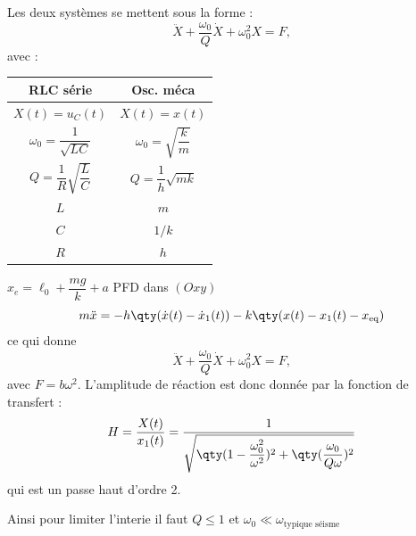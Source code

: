 \begin{solution}
\begin{questions}
    \questioncours Les deux systèmes se mettent sous la forme :
    $$\ddot{X} + \dfrac{\omega_0}{Q}\dot{X} + \omega_0^2 X = F,$$
    avec : \\
    \begin{tabular}{c|c}
        \textbf{RLC série} & \textbf{Osc. méca} \\ \hline
        $X(t) = u_C(t)$ & $X(t) = x(t)$ \\
        $\omega_0 = \dfrac{1}{\sqrt{LC}}$ & $\omega_0 = \sqrt{\dfrac{k}{m}}$ \\
        $Q = \dfrac{1}{R}\sqrt{\dfrac{L}{C}}$ & $Q = \dfrac{1}{h}\sqrt{mk}$ \\ \hline
        $L$ & $m$ \\
        $C$ & $1/k$ \\
        $R$ & $h$
    \end{tabular}
    \question $x_e = \ell_0 + \dfrac{mg}{k} + a$
    \question PFD dans $(Oxy)$
    $$m\ddot{x} = - h\qty(\dot{x}(t) - \dot{x}_1(t)) - k\qty(x(t) - x_1(t) - x_\text{eq})$$
    ce qui donne
    $$\ddot{X} + \dfrac{\omega_0}{Q}\dot{X} + \omega_0^2 X = F,$$
    avec $F = b\omega^2$.
    \question L'amplitude de réaction est donc donnée par la fonction de transfert :
    $$H = \dfrac{X(t)}{x_1(t)} = \dfrac{1}{\sqrt{\qty(1-\dfrac{\omega_0^2}{\omega^2})^2 + \qty(\dfrac{\omega_0}{Q\omega})^2}}$$
    qui est un passe haut d'ordre 2.

    Ainsi pour limiter l'interie il faut $Q \leqslant 1$ et $\omega_0 \ll \omega_\text{typique séisme}$
\end{questions}
\end{solution}
